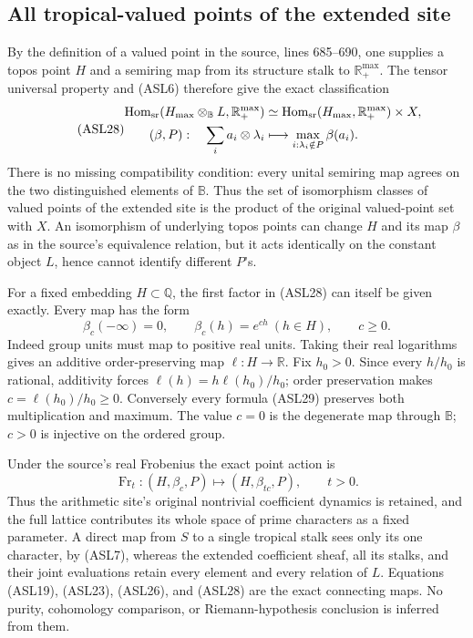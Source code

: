 \subsection{All tropical-valued points of the extended site}

By the definition of a valued point in the source, lines 685--690,
one supplies a topos point $H$ and a semiring map from its structure
stalk to $\mathbb R_+^{\max}$. The tensor universal property and
(ASL6) therefore give the exact classification
\begin{equation}\tag{ASL28}
 \begin{split}
 \operatorname{Hom}_{\rm sr}
   (H_{\max}\otimes_{\mathbb B}L,\mathbb R_+^{\max})
 &\simeq
 \operatorname{Hom}_{\rm sr}(H_{\max},\mathbb R_+^{\max})\times X,\\
 (\beta,P):\quad
 \sum_i a_i\otimes\lambda_i
 &\longmapsto\max_{i:\lambda_i\notin P}\beta(a_i).
 \end{split}
\end{equation}
There is no missing compatibility condition: every unital semiring
map agrees on the two distinguished elements of $\mathbb B$.
Thus the set of isomorphism classes of valued points of the extended
site is the product of the original valued-point set with $X$.
An isomorphism of underlying topos points can change $H$ and its
map $\beta$ as in the source's equivalence relation, but it acts
identically on the constant object $L$, hence cannot identify
different $P$'s.

For a fixed embedding $H\subset\mathbb Q$, the first factor in
(ASL28) can itself be given exactly. Every map has the form
\begin{equation}\tag{ASL29}
 \beta_c(-\infty)=0,\qquad
 \beta_c(h)=e^{ch}\ (h\in H),\qquad c\ge0.
\end{equation}
Indeed group units must map to positive real units. Taking their
real logarithms gives an additive order-preserving map
$\ell:H\to\mathbb R$. Fix $h_0>0$. Since every $h/h_0$ is rational,
additivity forces $\ell(h)=h\ell(h_0)/h_0$; order preservation makes
$c=\ell(h_0)/h_0\ge0$. Conversely every formula (ASL29) preserves
both multiplication and maximum. The value $c=0$ is the degenerate
map through $\mathbb B$; $c>0$ is injective on the ordered group.

Under the source's real Frobenius the exact point action is
\begin{equation}\tag{ASL30}
 \operatorname{Fr}_t:(H,\beta_c,P)\longmapsto
                         (H,\beta_{tc},P),\qquad t>0.
\end{equation}
Thus the arithmetic site's original nontrivial coefficient dynamics
is retained, and the full lattice contributes its whole space of
prime characters as a fixed parameter. A direct map from $S$ to a
single tropical stalk sees only its one character, by (ASL7), whereas
the extended coefficient sheaf, all its stalks, and their joint
evaluations retain every element and every relation of $L$.
Equations (ASL19), (ASL23), (ASL26), and (ASL28) are the exact
connecting maps. No purity, cohomology comparison, or Riemann-hypothesis
conclusion is inferred from them.

